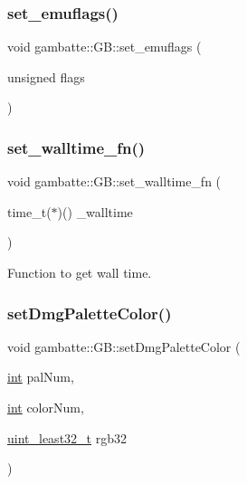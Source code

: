 \mbox{\label{classgambatte_1_1GB_a46e4849dcde049e8667cd282864389d5}} 
\subsubsection{\texorpdfstring{set\+\_\+emuflags()}{set\_emuflags()}}
{\footnotesize\ttfamily void gambatte\+::\+G\+B\+::set\+\_\+emuflags (\begin{DoxyParamCaption}\item[{unsigned}]{flags }\end{DoxyParamCaption})}

\mbox{\label{classgambatte_1_1GB_a910300b95fe3c38e7d6c0b3f11c017c5}} 
\subsubsection{\texorpdfstring{set\+\_\+walltime\+\_\+fn()}{set\_walltime\_fn()}}
{\footnotesize\ttfamily void gambatte\+::\+G\+B\+::set\+\_\+walltime\+\_\+fn (\begin{DoxyParamCaption}\item[{time\+\_\+t($\ast$)()}]{\+\_\+walltime }\end{DoxyParamCaption})}

Function to get wall time. \mbox{\label{classgambatte_1_1GB_a051afa03a39e9012d5c64ea0c6e3e852}} 
\subsubsection{\texorpdfstring{set\+Dmg\+Palette\+Color()}{setDmgPaletteColor()}}
{\footnotesize\ttfamily void gambatte\+::\+G\+B\+::set\+Dmg\+Palette\+Color (\begin{DoxyParamCaption}\item[{\hyperlink{ioapi_8h_a787fa3cf048117ba7123753c1e74fcd6}{int}}]{pal\+Num,  }\item[{\hyperlink{ioapi_8h_a787fa3cf048117ba7123753c1e74fcd6}{int}}]{color\+Num,  }\item[{\hyperlink{namespacegambatte_a0639f09fccfbbd5a8e0796318768e370}{uint\+\_\+least32\+\_\+t}}]{rgb32 }\end{DoxyParamCaption})}


